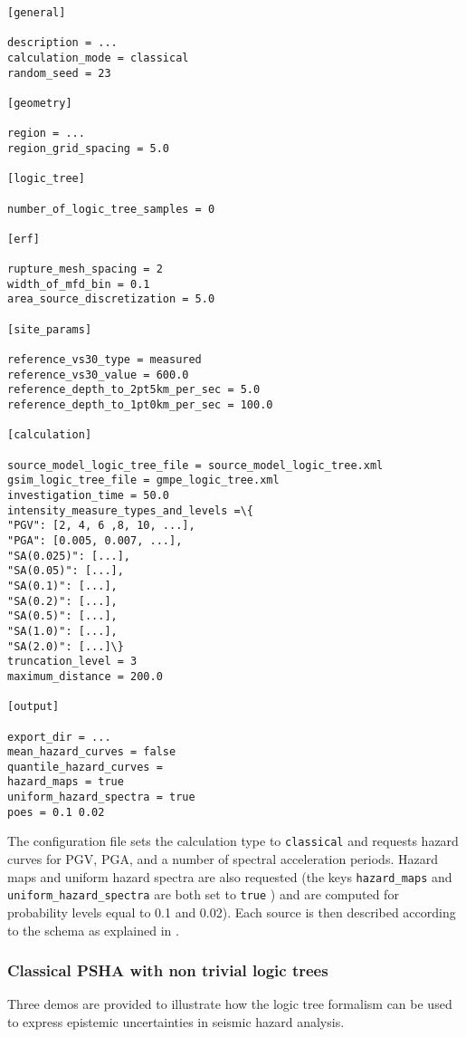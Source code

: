 \begin{Verbatim}[frame=single, commandchars=\\\{\}, fontsize=\normalsize]
[general]

description = ...
calculation_mode = classical
random_seed = 23

[geometry]

region = ...
region_grid_spacing = 5.0

[logic_tree]

number_of_logic_tree_samples = 0

[erf]

rupture_mesh_spacing = 2
width_of_mfd_bin = 0.1
area_source_discretization = 5.0

[site_params]

reference_vs30_type = measured
reference_vs30_value = 600.0
reference_depth_to_2pt5km_per_sec = 5.0
reference_depth_to_1pt0km_per_sec = 100.0

[calculation]

source_model_logic_tree_file = source_model_logic_tree.xml
gsim_logic_tree_file = gmpe_logic_tree.xml
investigation_time = 50.0
intensity_measure_types_and_levels =\{
"PGV": [2, 4, 6 ,8, 10, ...], 
"PGA": [0.005, 0.007, ...], 
"SA(0.025)": [...], 
"SA(0.05)": [...],
"SA(0.1)": [...], 
"SA(0.2)": [...], 
"SA(0.5)": [...], 
"SA(1.0)": [...],
"SA(2.0)": [...]\}
truncation_level = 3
maximum_distance = 200.0

[output]

export_dir = ...
mean_hazard_curves = false
quantile_hazard_curves =
hazard_maps = true
uniform_hazard_spectra = true
poes = 0.1 0.02
\end{Verbatim}
The configuration file sets the calculation type to \texttt{classical} and requests hazard curves for PGV, PGA, and a number of
spectral acceleration periods. Hazard maps and uniform hazard spectra are also requested (the keys \texttt{hazard\_\-maps}
and \texttt{uniform\_\-hazard\_\-spectra} are both set to \texttt{true} ) and are computed for probability levels equal to 0.1 and 0.02).
Each source is then described according to the schema as explained in \label{chap:oqhazintro}.

\subsubsection{Classical PSHA with non trivial logic trees}
Three demos are provided to illustrate how the logic tree formalism can be used to express epistemic uncertainties in seismic hazard analysis.\\

